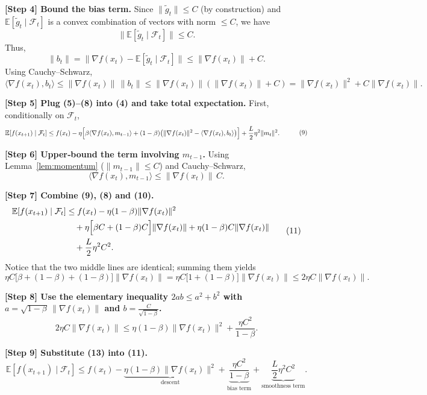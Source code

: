 \documentclass{article}
\begin{document}
\noindent\textbf{[Step 4] Bound the bias term.}
Since $\|\tilde g_t\|\le C$ (by construction) and $\mathbb{E}[\tilde g_t\mid\mathcal{F}_t]$ is a convex combination of vectors with norm $\le C$, we have
\[
\|\mathbb{E}[\tilde g_t\mid\mathcal{F}_t]\|\le C.
\]
Thus,
\[
\|b_t\|=\|\nabla f(x_t)-\mathbb{E}[\tilde g_t\mid\mathcal{F}_t]\|
\le \|\nabla f(x_t)\|+C .
\]
Using Cauchy–Schwarz,
\[
\langle\nabla f(x_t),b_t\rangle\le \|\nabla f(x_t)\|\,\|b_t\|
\le \|\nabla f(x_t)\|(\|\nabla f(x_t)\|+C)
= \|\nabla f(x_t)\|^2 + C\|\nabla f(x_t)\|.
\tag{8}
\]

\noindent\textbf{[Step 5] Plug (5)–(8) into (4) and take total expectation.}
First, conditionally on $\mathcal{F}_t$,
\[
\begin{aligned}
\mathbb{E}[f(x_{t+1})\mid\mathcal{F}_t]
&\le f(x_t)-\eta\Bigl[
\beta\langle\nabla f(x_t),m_{t-1}\rangle
+(1-\beta)\bigl(\|\nabla f(x_t)\|^2-\langle\nabla f(x_t),b_t\rangle\bigr)
\Bigr]
+\frac{L}{2}\eta^2\|m_t\|^2 .
\end{aligned}
\tag{9}
\]

\noindent\textbf{[Step 6] Upper‑bound the term involving $m_{t-1}$.}
Using Lemma~\ref{lem:momentum} ($\|m_{t-1}\|\le C$) and Cauchy–Schwarz,
\[
\langle\nabla f(x_t),m_{t-1}\rangle\le \|\nabla f(x_t)\|\,C .
\tag{10}
\]

\noindent\textbf{[Step 7] Combine (9), (8) and (10).}
\[
\begin{aligned}
\mathbb{E}[f(x_{t+1})\mid\mathcal{F}_t]
&\le f(x_t)-\eta(1-\beta)\|\nabla f(x_t)\|^2   \\
&\quad +\eta\Bigl[\beta C + (1-\beta)C\Bigr]\|\nabla f(x_t)\|
   +\eta(1-\beta)C\|\nabla f(x_t)\| \\
&\quad +\frac{L}{2}\eta^2 C^2 .
\end{aligned}
\tag{11}
\]
Notice that the two middle lines are identical; summing them yields
\[
\eta C\bigl[\beta + (1-\beta) + (1-\beta)\bigr]\|\nabla f(x_t)\|
= \eta C\bigl[1 + (1-\beta)\bigr]\|\nabla f(x_t)\|
\le 2\eta C\|\nabla f(x_t)\|.
\tag{12}
\]

\noindent\textbf{[Step 8] Use the elementary inequality $2ab\le a^2+b^2$ with $a=\sqrt{1-\beta}\,\|\nabla f(x_t)\|$ and $b=\frac{C}{\sqrt{1-\beta}}$.}
\[
2\eta C\|\nabla f(x_t)\|
\le \eta(1-\beta)\|\nabla f(x_t)\|^2
   +\frac{\eta C^2}{1-\beta}.
\tag{13}
\]

\noindent\textbf{[Step 9] Substitute (13) into (11).}
\[
\mathbb{E}[f(x_{t+1})\mid\mathcal{F}_t]
\le f(x_t)
      -\underbrace{\eta(1-\beta)\|\nabla f(x_t)\|^2}_{\text{descent}}
      +\underbrace{\frac{\eta C^2}{1-\beta}}_{\text{bias term}}
      +\underbrace{\frac{L}{2}\eta^2 C^2}_{\text{smoothness term}} .
\tag{14}
\]
\end{document}
